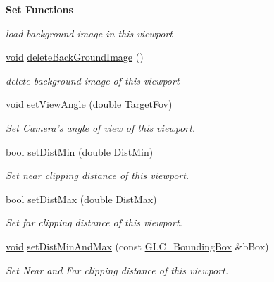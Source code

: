 \begin{Indent}{\bf Set Functions}
\begin{DoxyCompactItemize}
\begin{DoxyCompactList}\small\item\em load background image in this viewport \end{DoxyCompactList}\item 
\hyperlink{group___u_a_v_objects_plugin_ga444cf2ff3f0ecbe028adce838d373f5c}{void} \hyperlink{class_g_l_c___viewport_afa716f8fe2b2d43b0abc27374a5a3b9f}{delete\-Back\-Ground\-Image} ()
\begin{DoxyCompactList}\small\item\em delete background image of this viewport \end{DoxyCompactList}\item 
\hyperlink{group___u_a_v_objects_plugin_ga444cf2ff3f0ecbe028adce838d373f5c}{void} \hyperlink{class_g_l_c___viewport_a3adc256ea3c1f72cbb940b140bf4b858}{set\-View\-Angle} (\hyperlink{_super_l_u_support_8h_a8956b2b9f49bf918deed98379d159ca7}{double} Target\-Fov)
\begin{DoxyCompactList}\small\item\em Set Camera's angle of view of this viewport. \end{DoxyCompactList}\item 
bool \hyperlink{class_g_l_c___viewport_aafbf39e42e3b177e7ccc404a1aa29817}{set\-Dist\-Min} (\hyperlink{_super_l_u_support_8h_a8956b2b9f49bf918deed98379d159ca7}{double} Dist\-Min)
\begin{DoxyCompactList}\small\item\em Set near clipping distance of this viewport. \end{DoxyCompactList}\item 
bool \hyperlink{class_g_l_c___viewport_a111e9621d81e460cbe64daa7180b8181}{set\-Dist\-Max} (\hyperlink{_super_l_u_support_8h_a8956b2b9f49bf918deed98379d159ca7}{double} Dist\-Max)
\begin{DoxyCompactList}\small\item\em Set far clipping distance of this viewport. \end{DoxyCompactList}\item 
\hyperlink{group___u_a_v_objects_plugin_ga444cf2ff3f0ecbe028adce838d373f5c}{void} \hyperlink{class_g_l_c___viewport_a00c1634489da23a597f8c9ba4df7b6a3}{set\-Dist\-Min\-And\-Max} (const \hyperlink{class_g_l_c___bounding_box}{G\-L\-C\-\_\-\-Bounding\-Box} \&b\-Box)
\begin{DoxyCompactList}\small\item\em Set Near and Far clipping distance of this viewport. \end{DoxyCompactList}\item 

\end{DoxyCompactItemize}
\end{Indent}
